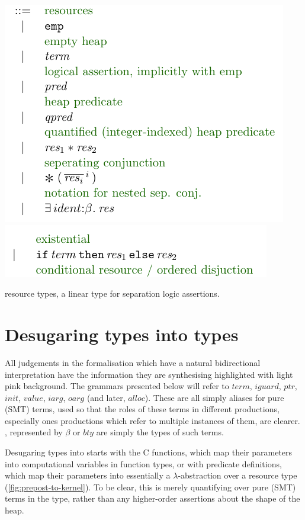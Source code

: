 \begin{marginfigure}
    \centering
    \includegraphics{figures/kernel-res-1}
    \includegraphics{figures/kernel-res-2}
    \caption{ resource types, a linear type for separation logic
        assertions.}\label{fig:kernel-res}
\end{marginfigure}

\section{Desugaring  types into  types}\label{sec:desugaring}

All judgements in the formalisation which have a natural bidirectional
interpretation have the information they are synthesising highlighted with
\colorbox{pink!30}{light pink} background. The grammars presented below will
refer to ${term}$, ${iguard}$, ${ptr}$, ${init}$, ${value}$, ${iarg}$, ${oarg}$
(and later, ${alloc}$). These are all simply aliases for pure (SMT) terms, used
so that the roles of these terms in different productions, especially ones
productions which refer to multiple instances of them, are clearer. , represented by $\beta$ or ${bty}$ are simply the types of such terms.

Desugaring  types into  starts with the C functions, which
map their parameters into computational variables in function types, or with
predicate definitions, which map their parameters into essentially a
$\lambda$-abstraction over a resource type (\cref{fig:prepost-to-kernel}). To
be clear, this is merely quantifying over pure (SMT) terms in the type, rather
than any higher-order assertions about the shape of the heap.

